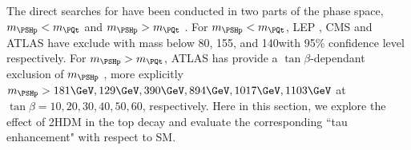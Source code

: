
The direct searches for \PSHp have been conducted in two parts of the phase space, $m_{\PSHp} < m_\PQt$  and $m_{\PSHp} > m_\PQt$ \cite{pdg2020}. For $m_{\PSHp} < m_\PQt$, LEP \cite{Abbiendi:2013hk}, CMS \cite{Khachatryan:2015qxa} and ATLAS \cite{Aad:2014kga} have exclude \PSHp with mass below 80\GeV, 155\GeV, and 140\GeV with 95\% confidence level respectively. For $m_{\PSHp} > m_\PQt$, ATLAS has provide a $\tan\beta$-dependant exclusion of $m_{\PSHp}$ \cite{Aaboud:2018gjj}, more explicitly $m_{\PSHp}>181\GeV, 129\GeV, 390\GeV, 894\GeV, 1017\GeV, 1103\GeV$ at $\tan\beta=10,20,30,40,50,60$, respectively. Here in this section, we explore the effect of 2HDM \PSHp in the top decay and evaluate the corresponding ``tau enhancement" with respect to SM.






